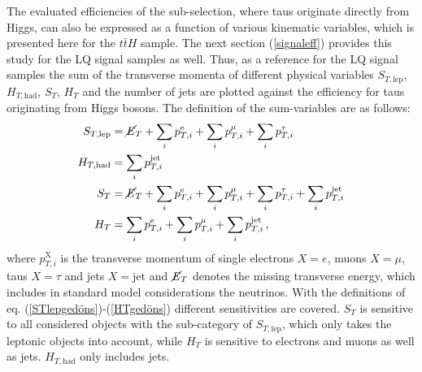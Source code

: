 The evaluated efficiencies of the sub-selection, where taus originate directly from Higgs, can also be expressed as a function of various kinematic variables, which is presented here for the $t\bar{t}H$ sample. The next section (\ref{signaleff}) provides this study for the LQ signal samples as well.\newline
Thus, as a reference for the LQ signal samples the sum of the transverse momenta of different physical variables $S_{T,\text{lep}}$, $H_{T,\text{had}}$, $S_{T}$, $H_{T}$ and the number of jets are plotted against the efficiency for taus originating from Higgs bosons. The definition of the sum-variables are as follows:
\begin{align}
S_{T,\text{lep}}&=\cancel{E}_{T}+\sum_i p_{T,i}^{\text{e}}+\sum_i p_{T,i}^{\mu}+\sum_i p_{T,i}^{\tau} \label{STlepgedöns}\\
H_{T,\text{had}}&=\sum_i p_{T,i}^{\text{jet}} \label{HThadgedöns}\\
S_{T}&=\cancel{E}_{T}+\sum_i p_{T,i}^{\text{e}}+\sum_i p_{T,i}^{\mu}+\sum_i p_{T,i}^{\tau}+\sum_i p_{T,i}^{\text{jet}} \label{STgedöns}\\
H_{T}&=\sum_i p_{T,i}^{\text{e}}+\sum_i p_{T,i}^{\mu}+\sum_i p_{T,i}^{\text{jet}}\,\text{,}
\label{HTgedöns}
\end{align}
where $p_{T,i}^\text{X}$ is the transverse momentum of single electrons $X=e$, muons $X=\mu$, taus $X=\tau$ and jets $X=\text{jet}$ and $\cancel{E}_{T}$ denotes the missing transverse energy, which includes in standard model considerations the neutrinos. With the definitions of eq. (\ref{STlepgedöns})-(\ref{HTgedöns}) different sensitivities are covered. $S_T$ is sensitive to all considered objects with the sub-category of $S_{T,\text{lep}}$, which only takes the leptonic objects into account, while $H_{T}$ is sensitive to electrons and muons as well as jets. $H_{T,\text{had}}$ only includes jets.\par
